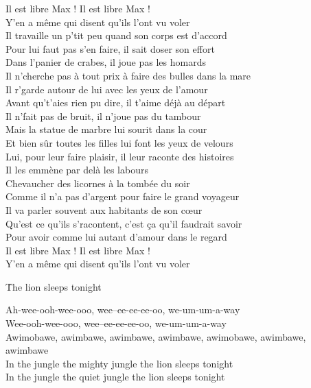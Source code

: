 \documentclass{novel}
\begin{document}
Il est libre Max ! Il est libre Max !\\
Y'en a même qui disent qu'ils l'ont vu voler\\

Il travaille un p'tit peu quand son corps est d'accord\\
Pour lui faut pas s'en faire, il sait doser son effort\\
Dans l'panier de crabes, il joue pas les homards\\
Il n'cherche pas à tout prix à faire des bulles dans la mare\\

Il r'garde autour de lui avec les yeux de l'amour\\
Avant qu't'aies rien pu dire, il t'aime déjà au départ\\
Il n'fait pas de bruit, il n'joue pas du tambour\\
Mais la statue de marbre lui sourit dans la cour\\

Et bien sûr toutes les filles lui font les yeux de velours\\
Lui, pour leur faire plaisir, il leur raconte des histoires\\
Il les emmène par delà les labours\\
Chevaucher des licornes à la tombée du soir\\

Comme il n'a pas d'argent pour faire le grand voyageur\\
Il va parler souvent aux habitants de son cœur\\
Qu'est ce qu'ils s'racontent, c'est ça qu'il faudrait savoir\\
Pour avoir comme lui autant d'amour dans le regard\\

Il est libre Max ! Il est libre Max !\\
Y'en a même qui disent qu'ils l'ont vu voler

\newpage
\large
\h*{The lion sleeps tonight}

Ah-wee-ooh-wee-ooo, wee--ee-ee-ee-oo, we-um-um-a-way\\
Wee-ooh-wee-ooo, wee--ee-ee-ee-oo, we-um-um-a-way\\

Awimobawe, awimbawe, awimbawe, awimbawe, awimobawe, awimbawe, awimbawe \\

In the jungle the mighty jungle the lion sleeps tonight\\
In the jungle the quiet jungle the lion sleeps tonight \\
\end{document}
